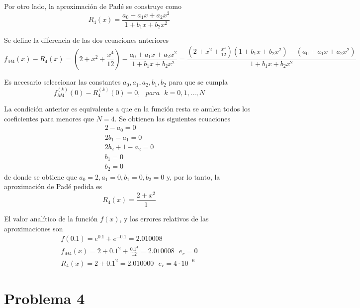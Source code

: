 \documentclass[a4paper, 12pt]{article}
\begin{document}
Por otro lado, la aproximación de Padé se construye como
\begin{equation*}
R_4(x) = \frac{a_0 + a_1x + a_2x^2}{1 + b_1x + b_2x^2}
\end{equation*} 

Se define la diferencia de las dos ecuaciones anteriores
\begin{equation*}
f_{M4}(x) - R_4(x) = (2 + x^2 + \frac{x^4}{12}) -
                    \frac{a_0 + a_1x + a_2x^2}{1 + b_1x + b_2x^2} =
                    \frac{(2 + x^2 + \frac{x^4}{12})(1 + b_1x + b_2x^2) - (a_0 + a_1x + a_2x^2)}{1 + b_1x + b_2x^2}
\end{equation*}

Es necesario seleccionar las constantes $a_0, a_1, a_2, b_1, b_2$ para que se
cumpla
\begin{equation*}
 f_{M4}^{(k)}(0) - R_4^{(k)}(0) = 0, ~~~para~~~k = 0, 1, ..., N
\end{equation*}

La condición anterior es equivalente a que en la función resta se anulen todos
los coeficientes para menores que $N=4$. Se obtienen las siguientes ecuaciones
\begin{align*}
2 - a_0 = 0\\
2b_1 - a_1 = 0\\
2b_2 + 1 - a_2 = 0\\
b_1 = 0\\
b_2 = 0
\end{align*}
de donde se obtiene que $a_0 = 2, a_1 = 0, b_1 = 0, b_2 = 0$ y, por lo tanto,
la aproximación de Padé pedida es
\begin{equation*}
R_4(x) = \frac{2 + x^2}{1}
\end{equation*}

El valor analítico de la función $f(x)$, y los errores relativos de las
aproximaciones son
\begin{align*}
f(0.1) = e^{0.1} + e^{-0.1} = 2.010008\\
f_{M4}(x) = 2 + 0.1^2 + \frac{0.1^4}{12} = 2.010008~~~e_r=0\\
R_4(x) = 2 + 0.1^2 = 2.010000~~~e_r = 4 \cdot 10^{-6}
\end{align*}

\section*{Problema 4}
\end{document}
